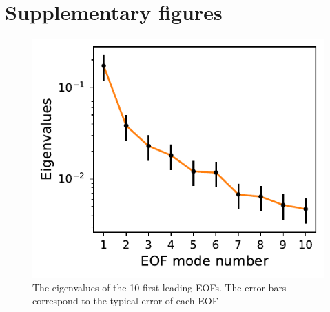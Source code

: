 
\chapter{Supplementary figures}
\begin{figure}[htbp]
    \centering
    \includegraphics[scale=0.8]{texfiles/figs/EOF_north_test.pdf}
    \caption{The eigenvalues of the 10 first leading EOFs. The error bars correspond to the typical error of each EOF}
    \label{fig:eof_test}
\end{figure}


